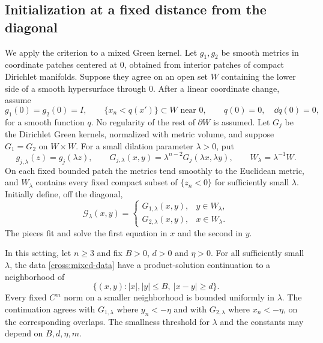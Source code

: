 \subsection{Initialization at a fixed distance from the diagonal}

We apply the criterion to a mixed Green kernel.  Let $g_1,g_2$ be smooth
metrics in coordinate patches centered at $0$, obtained from interior
patches of compact Dirichlet manifolds.  Suppose they agree on an open
set $W$ containing the lower side of a smooth hypersurface through $0$.
After a linear coordinate change, assume
\[
 g_1(0)=g_2(0)=I,\qquad
 \{x_n<q(x')\}\subset W\text{ near }0,\qquad
 q(0)=0,\quad \dd q(0)=0,
\]
for a smooth function $q$.  No regularity of the rest of $\partial W$
is assumed.
Let $G_j$ be the Dirichlet Green kernels, normalized with metric volume,
and suppose $G_1=G_2$ on $W\times W$.
For a small dilation parameter $\lambda>0$, put
\begin{equation}\label{cross:dilation}
 g_{j,\lambda}(z)=g_j(\lambda z),\qquad
 G_{j,\lambda}(x,y)=\lambda^{n-2}G_j(\lambda x,\lambda y),
 \qquad W_\lambda=\lambda^{-1}W.
\end{equation}
On each fixed bounded patch the metrics tend smoothly to the Euclidean
metric, and $W_\lambda$ contains every fixed compact subset of
$\{z_n<0\}$ for sufficiently small $\lambda$.
Initially define, off the diagonal,
\begin{equation}\label{cross:mixed-data}
 \mathcal G_\lambda(x,y)=
 \begin{cases}
 G_{1,\lambda}(x,y),&y\in W_\lambda,\\
 G_{2,\lambda}(x,y),&x\in W_\lambda.
 \end{cases}
\end{equation}
The pieces fit and solve the first equation in $x$ and the second in $y$.

\begin{proposition}\label{cross:initial}
In this setting, let $n\ge3$ and fix $B>0$, $d>0$ and $\eta>0$.
For all sufficiently small $\lambda$, the data
\eqref{cross:mixed-data} have a product-solution continuation to a
neighborhood of
\[
 \{(x,y):|x|,|y|\le B,\ |x-y|\ge d\}.
\]
Every fixed $C^m$ norm on a smaller neighborhood is bounded uniformly
in $\lambda$.  The continuation agrees with $G_{1,\lambda}$ where
$y_n<-\eta$ and with $G_{2,\lambda}$ where $x_n<-\eta$, on the
corresponding overlaps.  The smallness threshold for $\lambda$ and
the constants may depend on $B,d,\eta,m$.
\end{proposition}

